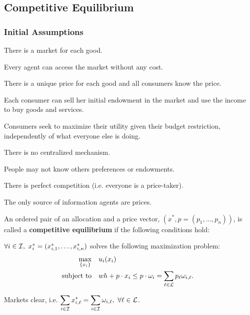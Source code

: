 \documentclass[8pt,a4paper]{extarticle}
\begin{document}
\begin{multicols}{3}
\subsection{Competitive Equilibrium}

\subsubsection*{Initial Assumptions}

\begin{bulletlist}
\item There is a market for each good.
\item Every agent can access the market without any cost.
\item There is a unique price for each good and all consumers know the price.
\item Each consumer can sell her initial endowment in the market and use the income to buy goods and services.
\item Consumers seek to maximize their utility given their budget restriction, independently of what everyone else is doing.
\item There is no centralized mechanism.
\item People may not know others preferences or endowments.
\item There is perfect competition (i.e. everyone is a price-taker).
\item The only source of information agents are prices.
\end{bulletlist}

\begin{boxdef}
	An ordered pair of an allocation and a price vector, $(x^*, p = (p_1, \ldots, p_n))$, is called a \textbf{competitive equilibrium} if the following conditions hold:
	\begin{eqlist}
	\item $\forall i \in \mathcal{I},\ x^*_i = (x^*_{i, 1}, \ldots, x^*_{i, n})$ solves the following maximization problem: 
		\begin{equation*}
		\begin{aligned}
			\max_{\{x_i\}}\quad	  & u_i(x_i) \\
			\text{\normalfont subject to} \quad & wh + p \cdot x_i \le p \cdot \omega_i = \sum_{\ell \in \mathcal{L}} p_\ell \omega_{i, \ell}.
		\end{aligned}
		\end{equation*}
	\item Markets clear, i.e. $\displaystyle \sum_{i \in \mathcal{I}} x^*_{i, \ell} = \sum_{i \in \mathcal{I}} \omega_{i, \ell},\ \forall \ell \in \mathcal{L}$.
	\end{eqlist}
\end{boxdef}


\end{multicols}
\end{document}
